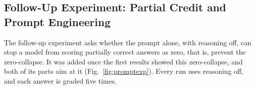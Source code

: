 \subsection{Follow-Up Experiment: Partial Credit and Prompt Engineering}
\label{sec:followmethod}

The follow-up experiment asks whether the prompt alone, with reasoning off, can stop a model from scoring
partially correct answers as zero, that is, prevent the zero-collapse. It was added once the first results
showed this zero-collapse, and both of its parts aim at it (Fig.~\ref{fig:promptexp}). Every run uses reasoning
off, and each answer is graded five times.

